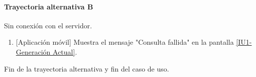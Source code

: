 \paragraph{Trayectoria alternativa B} \label{SUB-U-CU1.1:TB}
	Sin conexión con el servidor.
	\begin{enumerate}[label=B\arabic*.]
		\item {[Aplicación móvil]} Muestra el mensaje "Consulta fallida" en la pantalla \hyperref[fig:monitoreoReal]{[IU1-Generación Actual]}.
	\end{enumerate}
	Fin de la trayectoria alternativa y fin del caso de uso.
